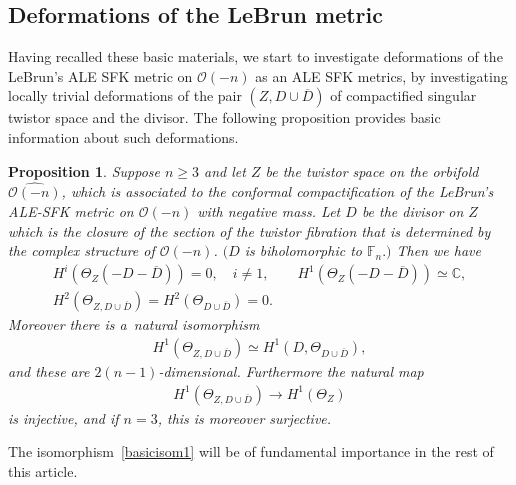 \documentclass[pdftex]{sigma}
\numberwithin{equation}{section}
\newtheorem{Proposition}[Theorem]{Proposition}
{\theoremstyle{definition}
\newtheorem{Definition}[Theorem]{Definition}
\newtheorem{Remark}[Theorem]{Remark}
}
\begin{document}
\subsection{Deformations of the LeBrun metric}
\label{ss:DLm}

Having recalled these basic materials, we start to investigate deformations of the LeBrun's ALE SFK metric on $\mathscr
O(-n)$ as an ALE SFK metrics, by investigating locally trivial deformations of the pair $(Z,D\cup\overline D)$ of
compactif\/ied singular twistor space and the divisor.
The following proposition provides basic information about such deformations.
\begin{Proposition}\label{prop:isom1}
Suppose $n\ge 3$ and let $Z$ be the twistor space on the orbifold $\widehat{\mathscr O(-n)}$, which is associated to the
conformal compactification of the LeBrun's ALE-SFK metric on $\mathscr O(-n)$ with negative mass.
Let $D$ be the divisor on $Z$ which is the closure of the section of the twistor fibration that is determined by the
complex structure of $\mathscr O(-n)$.
$(D$ is biholomorphic to $\mathbb{F}_n.)$ Then we have
\begin{gather}
\label{cohomdim1}
H^i( \Theta_Z(-D-\overline D) ) = 0,
\quad
i\neq 1,
\qquad
H^1( \Theta_Z(-D-\overline D) ) \simeq \mathbb{C},
\\
H^2(\Theta_{Z, D\cup\overline D}) = H^2 ( \Theta_{D\cup \overline D} ) = 0.
\label{van1}
\end{gather}
Moreover there is a~natural isomorphism
\begin{gather}
\label{basicisom1}
H^1 (\Theta_{Z,  D \cup \overline D} ) \simeq H^1 (D, \Theta_{ D \cup \overline D} ),
\end{gather}
and these are $2(n-1)$-dimensional.
Furthermore the natural map
\begin{gather}
\label{forget}
H^1(\Theta_{Z,D\cup\overline D})
\longrightarrow
H^1(\Theta_Z)
\end{gather}
is injective, and if $n=3$, this is moreover surjective.
\end{Proposition}

The isomorphism~\eqref{basicisom1} will be of fundamental importance in the rest of this article.
\end{document}
